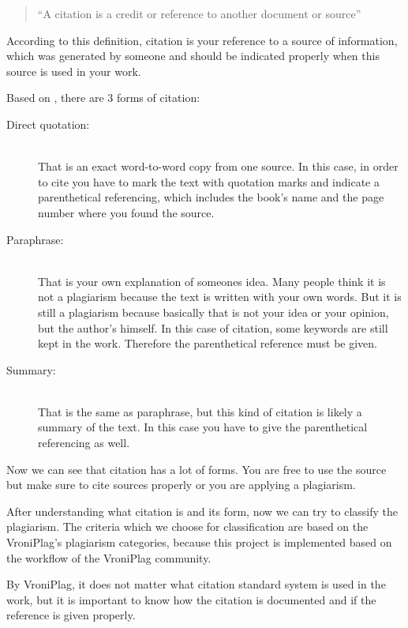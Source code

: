 \begin{quote}\enquote{A citation is a credit or reference to another document or source}\\ \citep{wiki:Citation}\end{quote}

According to this definition, citation is your reference to a source of information, which was generated by someone 
and should be indicated properly when this source is used in your work.

Based on \citet{Wiredprof2010}, there are 3 forms of citation:

\begin{description}
\item[Direct quotation:] \hfill \\
That is an exact word-to-word copy from one source. In this case, in order to cite you have to mark 
the text with quotation marks and indicate a  parenthetical referencing, which includes the book’s name and the page 
number where you found the source.
\item[Paraphrase:] \hfill \\
That is your own explanation of someones idea. Many people think it is not a plagiarism because the text 
is written with your own words. But it is still a plagiarism because basically that is not your idea or your opinion, 
but the author’s himself. In this case of citation, some keywords are still kept in the work. Therefore the 
parenthetical reference must be given.
\item[Summary:] \hfill \\
That is the same as paraphrase, but this kind of citation is likely a summary of the text. In this case you 
have to give the parenthetical referencing as well.
\end{description}

Now we can see that citation has a lot of forms. You are free to use the source but make sure to cite sources properly 
or you are applying a plagiarism.

After understanding what citation is and its form, now we can try to classify the plagiarism. The criteria which we 
choose for classification are based on the VroniPlag’s plagiarism categories, because this project is implemented 
based on the workflow of the VroniPlag community. 

By VroniPlag, it does not matter what citation standard system is used in the work, but it is important to know how the 
citation is documented and if the reference is given properly.

